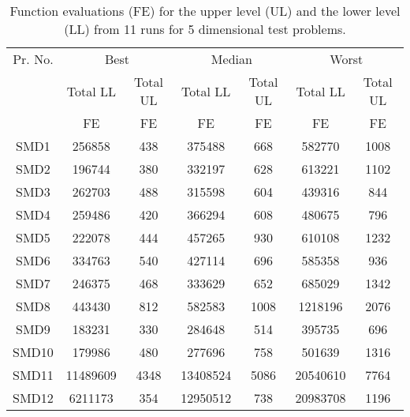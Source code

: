 \documentclass[twoside]{article}
\begin{document}
\begin{table*}[hbt]
\caption{Function evaluations (FE) for the upper level (UL) and the lower level (LL) from 11
  runs for 5 dimensional test problems.} 
\label{tab:table1a}
{\small\begin{center}
\begin{tabular}{|c|c|c|c|c|c|c|} \hline
Pr. No.	&	\multicolumn{2}{|c|}{Best}	&	\multicolumn{2}{|c|}{Median}	&	\multicolumn{2}{|c|}{Worst}	\\	\cline{2-7}
	&		\multicolumn{1}{|c|}{Total LL}	&	\multicolumn{1}{|c|}{Total UL}	&	\multicolumn{1}{|c|}{Total LL}	&	\multicolumn{1}{|c|}{Total UL}	&	\multicolumn{1}{|c|}{Total LL}	&\multicolumn{1}{|c|}{Total UL}	\\	
	&	\multicolumn{1}{|c|}{FE} 	&
        \multicolumn{1}{|c|}{FE}	&\multicolumn{1}{|c|}{FE}         &\multicolumn{1}{|c|}{FE}        &
        \multicolumn{1}{|c|}{FE}& \multicolumn{1}{|c|}{FE}	\\ \hline	
SMD1	&	256858	&	438	&	375488	&	668	&	582770	&	1008	\\	\hline
SMD2	&	196744	&	380	&	332197	&	628	&	613221	&	1102	\\	\hline
SMD3	&	262703	&	488	&	315598	&	604	&	439316	&	844	\\	\hline
SMD4	&	259486	&	420	&	366294	&	608	&	480675	&	796	\\	\hline
SMD5	&	222078	&	444	&	457265	&	930	&	610108	&	1232	\\	\hline
SMD6	&	334763	&	540	&	427114	&	696	&	585358	&	936	\\	\hline
SMD7	&	246375	&	468	&	333629	&	652	&	685029	&	1342	\\	\hline
SMD8	&	443430	&	812	&	582583	&	1008	&	1218196	&	2076	\\	\hline
SMD9	&	183231	&	330	&	284648	&	514	&	395735	&	696	\\	\hline
SMD10	&	179986	&	480	&	277696	&	758	&	501639	&	1316	\\	\hline
SMD11	&	11489609	&	4348	&	13408524	&	5086	&	20540610	&	7764	\\	\hline
SMD12	&	6211173	&	354	&	12950512	&	738	&	20983708	&	1196	\\	\hline
\end{tabular}
\end{center}}
\end{table*}
\end{document}
